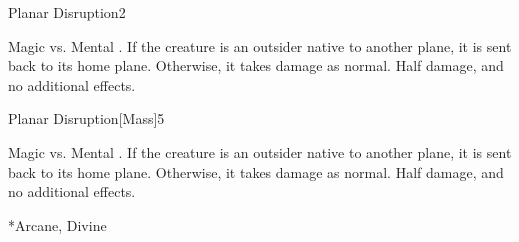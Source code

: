 \begin{spellsection}{Planar Disruption}{2}
    \begin{spellheader}
    \end{spellheader}
    \begin{spellcontent}
        \begin{spelltargetinginfo}
        \end{spelltargetinginfo}
        \begin{spelleffects}
            \begin{spellattack}{Magic vs. Mental}
                \spellsuccess {}.
                \spellcritical If the creature is an outsider native to another plane, it is sent back to its home plane. Otherwise, it takes damage as normal.
                \spellfailure Half damage, and no additional effects.
            \end{spellattack}
        \end{spelleffects}
    \end{spellcontent}
    \begin{spellfooter}
        \miscastrandom
    \end{spellfooter}
\end{spellsection}

\begin{spellsection}{Planar Disruption}[Mass]{5}
    \begin{spellheader}
    \end{spellheader}
    \begin{spellcontent}
        \begin{spelltargetinginfo}
        \end{spelltargetinginfo}
        \begin{spelleffects}
            \begin{spellattack}{Magic vs. Mental}
                \spellsuccess {}.
                \spellcritical If the creature is an outsider native to another plane, it is sent back to its home plane. Otherwise, it takes damage as normal.
                \spellfailure Half damage, and no additional effects.
            \end{spellattack}
        \end{spelleffects}
    \end{spellcontent}
    \begin{spellfooter}
        *{Arcane, Divine}
        \miscastexplode
    \end{spellfooter}
\end{spellsection}

